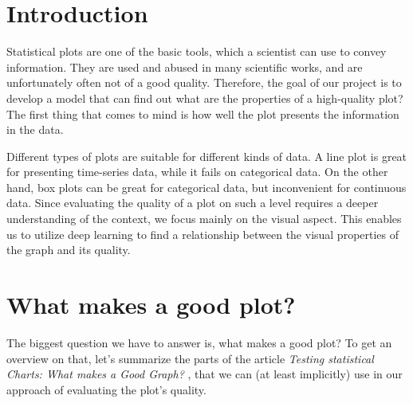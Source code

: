 \documentclass[fleqn,moreauthors,10pt]{ds_report}
\affiliation{\textit{Advisors: Assoc. Prof. dr. Erik Štrumbelj , Assoc. Prof. dr. Tomaž Curk}}
\begin{document}
	
	\flushbottom 
	
	\maketitle 
	
	\thispagestyle{empty} 
	
	
	\section*{Introduction}
	Statistical plots are one of the basic tools, which a scientist can use to convey information. They are used and abused in many scientific works, and are unfortunately often not of a good quality. Therefore, the goal of our project is to develop a model that can find out what are the properties of a high-quality plot? The first thing that comes to mind is how well the plot presents the information in the data. 
	
	Different types of plots are suitable for different kinds of data. A line plot is great for presenting time-series data, while it fails on categorical data. On the other hand, box plots can be great for categorical data, but inconvenient for continuous data. Since evaluating the quality of a plot on such a level requires a deeper understanding of the context, we focus mainly on the visual aspect. This enables us to utilize deep learning to find a relationship between the visual properties of the graph and its quality. 
	
	
	
	\section*{What makes a good plot?}
	The biggest question we have to answer is, what makes a good plot? To get an overview on that, let's summarize the parts of the article \emph{Testing statistical Charts: What makes a Good Graph?} \cite{Whatmakesagoodplot}, that we can (at least implicitly) use in our approach of evaluating the plot's quality. 
	
\end{document}
